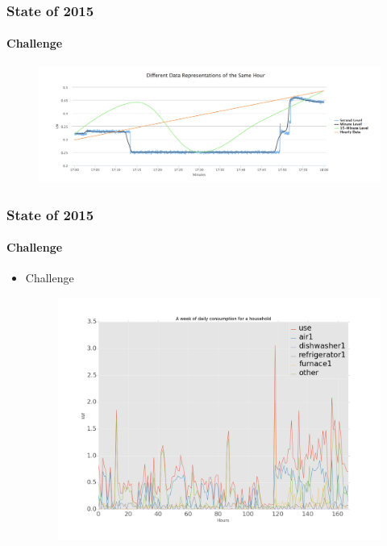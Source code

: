 \documentclass{beamer}              %
\begin{document}
\begin{frame}
	\frametitle{State of 2015}
	\framesubtitle{Challenge}
		\begin{figure}[!ht]
			\includegraphics[scale=0.22]{./figures/hourlyexamplefixed.png}
		\end{figure}
\end{frame}



\begin{frame}
	\frametitle{State of 2015}
	\framesubtitle{Challenge}
	\begin{itemize}
		\item{Challenge}
		\begin{figure}[!ht]
			\includegraphics[scale=0.18]{./figures/weekconsump}
		\end{figure}
	\end{itemize}

\end{frame}
\end{document}
